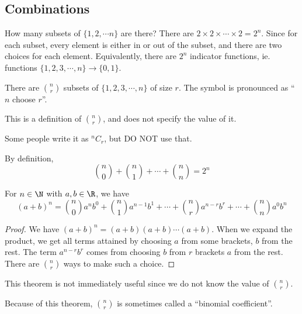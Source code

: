 \documentclass[a4paper]{article}
\begin{document}
  \subsection{Combinations}
  \begin{eg}
    How many subsets of $\{1, 2, \cdots n\}$ are there? There are $2\times 2\times \cdots \times 2 = 2^n$. Since for each subset, every element is either in or out of the subset, and there are two choices for each element. Equivalently, there are $2^n$ indicator functions, ie. functions $\{1, 2, 3, \cdots, n\} \to \{0, 1\}$.
  \end{eg}

  \begin{defi}
    There are $\binom{n}{r}$ subsets of $\{1, 2, 3, \cdots, n\}$ of size $r$. The symbol is pronounced as ``$n$ choose $r$''.

    \note This is a definition of $\binom{n}{r}$, and does not specify the value of it.
  \end{defi}

  \begin{notation}
    Some people write it as $^nC_r$, but DO NOT use that.
  \end{notation}

  \begin{prop}
    By definition, 
    \[
      \binom{n}{0} + \binom{n}{1} + \cdots + \binom{n}{n} = 2^n
    \]
  \end{prop}

  \begin{thm}
    For $n\in \N$ with $a, b\in \R$, we have
    \[
      (a + b)^n = \binom{n}{0}a^n b^0 + \binom{n}{1}a^{n-1}b^1 + \cdots + \binom{n}{r}a^{n - r}b^r + \cdots + \binom{n}{n}a^0b^n
    \]
  \end{thm}

  \begin{proof}
    We have $(a + b)^n = (a + b)(a + b)\cdots (a + b)$. When we expand the product, we get all terms attained by choosing $a$ from some brackets, $b$ from the rest. The term $a^{n - r}b^r$ comes from choosing $b$ from $r$ brackets $a$ from the rest. There are $\binom{n}{r}$ ways to make such a choice.
  \end{proof}
  \note This theorem is not immediately useful since we do not know the value of $\binom{n }{r}$.

  Because of this theorem, $\binom{n }{r}$ is sometimes called a ``binomial coefficient''.
\end{document}
